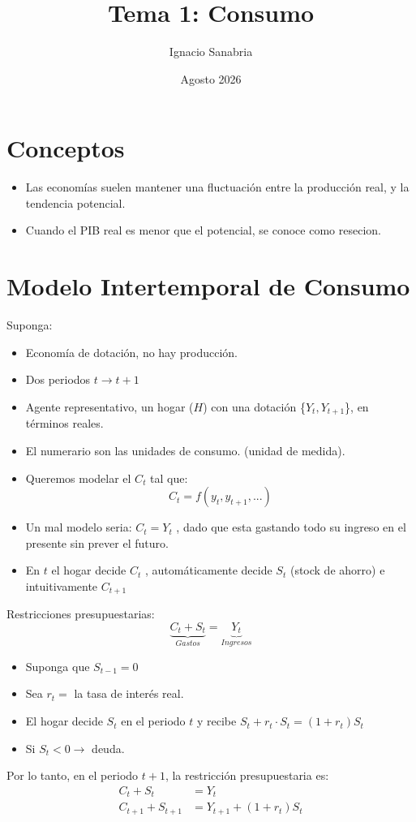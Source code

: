 \documentclass[12pt]{article}
\title{Tema 1: Consumo}
\author{Ignacio Sanabria}
\date{Agosto 2026}
\begin{document}
\maketitle
\section{Conceptos}
\begin{itemize}
    \item Las economías suelen mantener una fluctuación entre la producción real, y la tendencia potencial. 
    \item Cuando el PIB real es menor que el potencial, se conoce como resecion. 
    
\end{itemize}
\section{Modelo Intertemporal de Consumo}
Suponga: 
\begin{itemize}
    \item Economía de dotación, no hay producción.
    \item Dos periodos $t\xrightarrow{}t+1$
    \item Agente representativo, un hogar ($H$) con una dotación \{$Y_t,Y_{t+1}$\}, en términos reales. 
    \item El numerario son las unidades de consumo. (unidad de medida).
    \item Queremos modelar el $C_t$ tal que: $$C_t=f(y_t,y_{t+1},...)$$
    \item Un mal modelo seria: $C_t=Y_t$ , dado que esta gastando todo su ingreso en el presente sin prever el futuro. 
    \item En $t$ el hogar decide $C_t$ , automáticamente decide $S_t$ (stock de ahorro) e intuitivamente $C_{t+1}$ 
\end{itemize}
Restricciones presupuestarias: 
\[\underbrace{C_t+S_t}_{Gastos} = \underbrace{Y_t}_{Ingresos} \]
\begin{itemize}
    \item Suponga que $S_{t-1}=0$
    \item Sea $r_t=$ la tasa de interés real.
    \item El hogar decide $S_t$ en el periodo $t$ y recibe $S_t+r_t\cdot S_t = (1+r_t)S_t $
    \item Si $S_t<0 \xrightarrow{}$ deuda. 
\end{itemize}
Por lo tanto, en el periodo $t+1$, la restricción presupuestaria es:
\begin{align*}
    C_t+S_t & =Y_t \\ C_{t+1}+S_{t+1} & =Y_{t+1}+(1+r_t)S_t
\end{align*}
\end{document}
